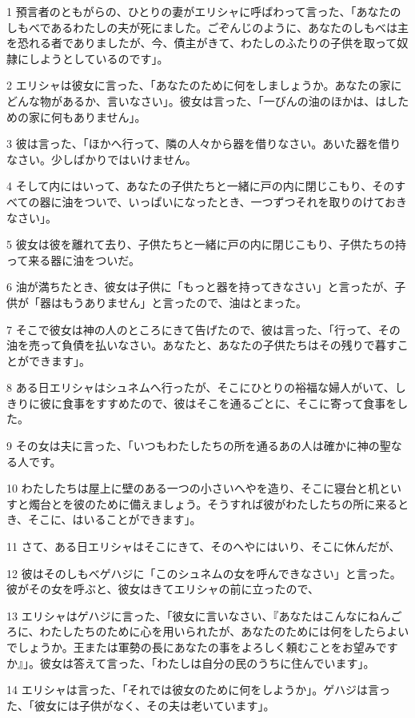 \par 1 預言者のともがらの、ひとりの妻がエリシャに呼ばわって言った、「あなたのしもべであるわたしの夫が死にました。ごぞんじのように、あなたのしもべは主を恐れる者でありましたが、今、債主がきて、わたしのふたりの子供を取って奴隷にしようとしているのです」。
\par 2 エリシャは彼女に言った、「あなたのために何をしましょうか。あなたの家にどんな物があるか、言いなさい」。彼女は言った、「一びんの油のほかは、はしための家に何もありません」。
\par 3 彼は言った、「ほかへ行って、隣の人々から器を借りなさい。あいた器を借りなさい。少しばかりではいけません。
\par 4 そして内にはいって、あなたの子供たちと一緒に戸の内に閉じこもり、そのすべての器に油をついで、いっぱいになったとき、一つずつそれを取りのけておきなさい」。
\par 5 彼女は彼を離れて去り、子供たちと一緒に戸の内に閉じこもり、子供たちの持って来る器に油をついだ。
\par 6 油が満ちたとき、彼女は子供に「もっと器を持ってきなさい」と言ったが、子供が「器はもうありません」と言ったので、油はとまった。
\par 7 そこで彼女は神の人のところにきて告げたので、彼は言った、「行って、その油を売って負債を払いなさい。あなたと、あなたの子供たちはその残りで暮すことができます」。
\par 8 ある日エリシャはシュネムへ行ったが、そこにひとりの裕福な婦人がいて、しきりに彼に食事をすすめたので、彼はそこを通るごとに、そこに寄って食事をした。
\par 9 その女は夫に言った、「いつもわたしたちの所を通るあの人は確かに神の聖なる人です。
\par 10 わたしたちは屋上に壁のある一つの小さいへやを造り、そこに寝台と机といすと燭台とを彼のために備えましょう。そうすれば彼がわたしたちの所に来るとき、そこに、はいることができます」。
\par 11 さて、ある日エリシャはそこにきて、そのへやにはいり、そこに休んだが、
\par 12 彼はそのしもべゲハジに「このシュネムの女を呼んできなさい」と言った。彼がその女を呼ぶと、彼女はきてエリシャの前に立ったので、
\par 13 エリシャはゲハジに言った、「彼女に言いなさい、『あなたはこんなにねんごろに、わたしたちのために心を用いられたが、あなたのためには何をしたらよいでしょうか。王または軍勢の長にあなたの事をよろしく頼むことをお望みですか』」。彼女は答えて言った、「わたしは自分の民のうちに住んでいます」。
\par 14 エリシャは言った、「それでは彼女のために何をしようか」。ゲハジは言った、「彼女には子供がなく、その夫は老いています」。
